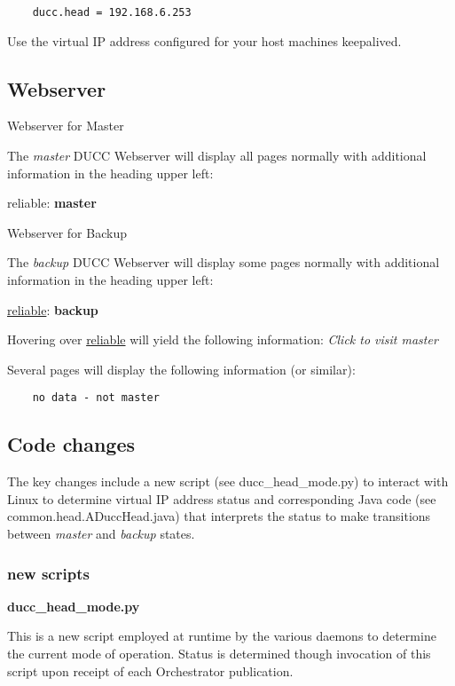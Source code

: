 \documentclass[letterpaper]{article}
\begin{document}
    \begin{verbatim}
	ducc.head = 192.168.6.253
   	\end{verbatim}
    
    Use the virtual IP address configured for your host machines keepalived. 
    
\subsection{Webserver}

	Webserver for Master

	The {\em master} DUCC Webserver will display all pages normally with additional
	information in the heading upper left:
	
	reliable: \textbf{master}
	
	Webserver for Backup
	
	The {\em backup} DUCC Webserver will display some pages normally with additional
	information in the heading upper left:
	
	\underline{reliable}: \textbf{backup}
   	
   	Hovering over \underline{reliable} will yield the following information:
   	{\em Click to visit master}
   	
   	Several pages will display the following information (or similar):
   	
   	\begin{verbatim}
	no data - not master
   	\end{verbatim}
	
\subsection{Code changes}

The key changes include a new script (see ducc\_head\_mode.py) to 
interact with Linux to determine virtual IP address status and 
corresponding Java code (see common.head.ADuccHead.java)
that interprets the status to make transitions between 
{\em master} and {\em backup} states.

\subsubsection{new scripts}

\textbf{ducc\_head\_mode.py}

This is a new script employed at runtime by the various daemons to
determine the current mode of operation.  Status is determined 
though invocation of this script upon receipt of each Orchestrator
publication.
\end{document}
